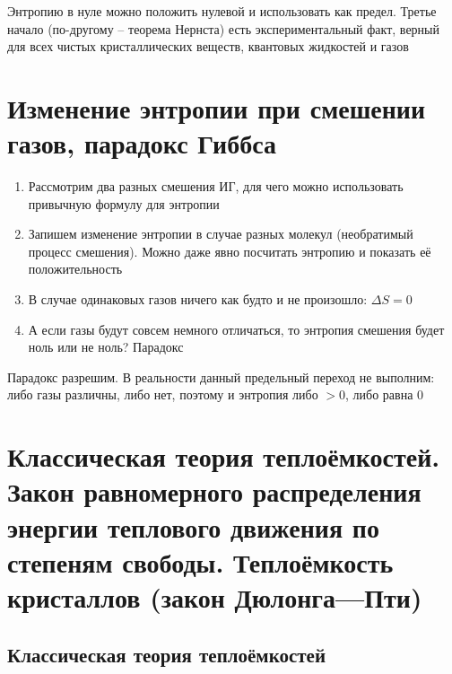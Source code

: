 \documentclass[a4paper, 14pt]{article}
\begin{document}
    Энтропию в нуле можно положить нулевой и использовать как предел.
    Третье начало (по-другому -- теорема Нернста) есть экспериментальный факт, верный для всех чистых кристаллических
    веществ, квантовых жидкостей и газов
    
    \section{Изменение энтропии при смешении газов, парадокс Гиббса}
    
    \begin{enumerate}
        \item Рассмотрим два разных смешения ИГ, для чего можно использовать привычную формулу для энтропии
        \item Запишем изменение энтропии в случае разных молекул (необратимый процесс смешения).
        Можно даже явно посчитать энтропию и показать её положительность
        \item В случае одинаковых газов ничего как будто и не произошло: $\Delta S = 0$
        \item А если газы будут совсем немного отличаться, то энтропия смешения будет ноль или не ноль?
        Парадокс
    \end{enumerate}
    
    Парадокс разрешим.
    В реальности данный предельный переход не выполним: либо газы различны, либо нет, поэтому и энтропия либо $>0$,
    либо равна $0$
    
    \section{Классическая теория теплоёмкостей.
    Закон равномерного распределения энергии теплового движения по степеням свободы.
    Теплоёмкость кристаллов (закон Дюлонга—Пти)}
    
    \subsection{Классическая теория теплоёмкостей}
    
\end{document}
